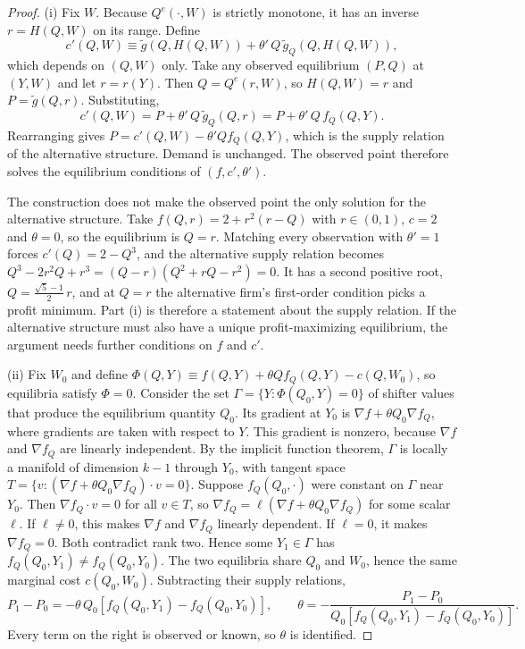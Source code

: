 \begin{proof}
(i) Fix $W$. Because $Q^e(\cdot, W)$ is strictly monotone, it has an inverse $r = H(Q, W)$ on its range. Define
\begin{equation*}
c'(Q, W) \equiv \tilde g\left(Q, H(Q, W)\right) + \theta'\, Q\, \tilde g_Q\left(Q, H(Q, W)\right) ,
\end{equation*}
which depends on $(Q, W)$ only. Take any observed equilibrium $(P, Q)$ at $(Y, W)$ and let $r = r(Y)$. Then
$Q = Q^e(r, W)$, so $H(Q, W) = r$ and $P = \tilde g(Q, r)$. Substituting,
\begin{equation*}
c'(Q, W) = P + \theta'\, Q\, \tilde g_Q(Q, r) = P + \theta'\, Q\, f_Q(Q, Y) .
\end{equation*}
Rearranging gives $P = c'(Q, W) - \theta' Q f_Q(Q, Y)$, which is the supply relation of the alternative structure. Demand
is unchanged. The observed point therefore solves the equilibrium conditions of $(f, c', \theta')$.

The construction does not make the observed point the only solution for the alternative structure. Take
$f(Q, r) = 2 + r^2(r - Q)$ with $r \in (0, 1)$, $c = 2$ and $\theta = 0$, so the equilibrium is $Q = r$. Matching every
observation with $\theta' = 1$ forces $c'(Q) = 2 - Q^3$, and the alternative supply relation becomes
$Q^3 - 2r^2Q + r^3 = (Q - r)(Q^2 + rQ - r^2) = 0$. It has a second positive root, $Q = \frac{\sqrt{5} - 1}{2}\,r$, and at
$Q = r$ the alternative firm's first-order condition picks a profit minimum. Part (i) is therefore a statement about the
supply relation. If the alternative structure must also have a unique profit-maximizing equilibrium, the argument needs
further conditions on $f$ and $c'$.

(ii) Fix $W_0$ and define $\Phi(Q, Y) \equiv f(Q, Y) + \theta Q f_Q(Q, Y) - c(Q, W_0)$, so equilibria satisfy
$\Phi = 0$. Consider the set $\Gamma = \{Y : \Phi(Q_0, Y) = 0\}$ of shifter values that produce the equilibrium quantity
$Q_0$. Its gradient at $Y_0$ is $\nabla f + \theta Q_0 \nabla f_Q$, where gradients are taken with respect to $Y$. This
gradient is nonzero, because $\nabla f$ and $\nabla f_Q$ are linearly independent. By the implicit function theorem,
$\Gamma$ is locally a manifold of dimension $k - 1$ through $Y_0$, with tangent space
$T = \{v : (\nabla f + \theta Q_0 \nabla f_Q)\cdot v = 0\}$. Suppose $f_Q(Q_0, \cdot)$ were constant on $\Gamma$ near
$Y_0$. Then $\nabla f_Q \cdot v = 0$ for all $v \in T$, so $\nabla f_Q = \ell(\nabla f + \theta Q_0\nabla f_Q)$ for some
scalar $\ell$. If $\ell \ne 0$, this makes $\nabla f$ and $\nabla f_Q$ linearly dependent. If $\ell = 0$, it makes
$\nabla f_Q = 0$. Both contradict rank two. Hence some $Y_1 \in \Gamma$ has $f_Q(Q_0, Y_1) \neq f_Q(Q_0, Y_0)$. The two
equilibria share $Q_0$ and $W_0$, hence the same marginal cost $c(Q_0, W_0)$. Subtracting their supply relations,
\begin{equation}\label{eq:03-lau-theta}
P_1 - P_0 = -\theta\, Q_0 \left[f_Q(Q_0, Y_1) - f_Q(Q_0, Y_0)\right], \qquad
\theta = -\frac{P_1 - P_0}{Q_0\left[f_Q(Q_0, Y_1) - f_Q(Q_0, Y_0)\right]} .
\end{equation}
Every term on the right is observed or known, so $\theta$ is identified.
\end{proof}

